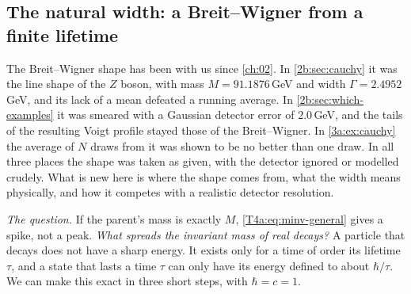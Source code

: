\subsection{The natural width: a Breit--Wigner from a finite lifetime}
\label{T4a:sec:bw}

The Breit--Wigner shape has been with us since \cref{ch:02}. In \cref{2b:sec:cauchy} it was the line shape of the $Z$ boson, with mass $M=91.1876$\,GeV and width $\Gamma=2.4952$\,GeV, and its lack of a mean defeated a running average. In \cref{2b:sec:which-examples} it was smeared with a Gaussian detector error of $2.0$\,GeV, and the tails of the resulting Voigt profile stayed those of the Breit--Wigner. In \cref{3a:ex:cauchy} the average of $N$ draws from it was shown to be no better than one draw. In all three places the shape was taken as given, with the detector ignored or modelled crudely. What is new here is where the shape comes from, what the width means physically, and how it competes with a realistic detector resolution.

\emph{The question.} If the parent's mass is exactly $M$, \eqref{T4a:eq:minv-general} gives a spike, not a peak. \emph{What spreads the invariant mass of real decays?} A particle that decays does not have a sharp energy. It exists only for a time of order its lifetime $\tau$, and a state that lasts a time $\tau$ can only have its energy defined to about $\hbar/\tau$. We can make this exact in three short steps, with $\hbar=c=1$.

